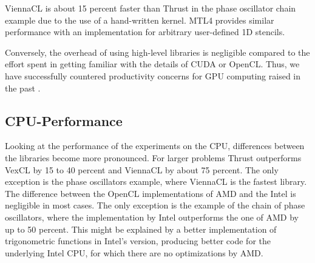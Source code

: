 \documentclass[final]{siamltex}
\begin{document}
ViennaCL is about 15 percent faster than Thrust in the phase oscillator chain
example due to the use of a hand-written kernel.
MTL4 provides similar performance with an implementation for arbitrary user-defined
1D stencils.

Conversely, the overhead of using high-level libraries is negligible compared
to the effort spent in getting familiar with the details of CUDA or OpenCL.
Thus, we have successfully countered productivity concerns for GPU computing
raised in the past \cite{bordawekar:gpu-productivity}.


\subsection{CPU-Performance}
Looking at the performance of the experiments on the CPU,
differences between the libraries become more pronounced. For larger problems Thrust outperforms VexCL
by 15 to 40 percent and ViennaCL by about 75 percent. The only exception is the phase oscillators
example, where ViennaCL is the fastest library. The difference
between the OpenCL implementations of AMD and the Intel is negligible in
most cases. The only exception is the example of the chain of phase oscillators,
where the implementation by Intel outperforms the one of AMD by up to 50 percent.
This might be explained by a better implementation of trigonometric functions in Intel's version,
producing better code for the underlying Intel CPU, for which there are no optimizations by AMD.
\end{document}
